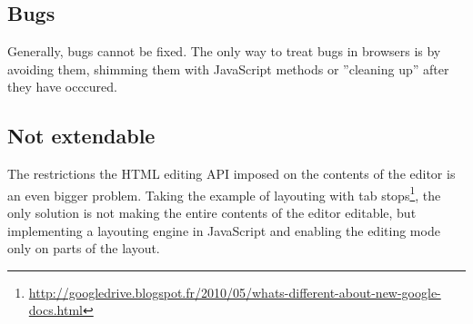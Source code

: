 \subsection{Bugs}

Generally, bugs cannot be fixed. The only way to treat bugs in browsers is by avoiding them, shimming them with JavaScript methods or ''cleaning up'' after they have occcured.

\subsection{Not extendable}
\label{subsec:treating_issues_last}

The restrictions the HTML editing API imposed on the contents of the editor is an even bigger problem. Taking the example of layouting with tab stops\footnote{\url{http://googledrive.blogspot.fr/2010/05/whats-different-about-new-google-docs.html}}, the only solution is not making the entire contents of the editor editable, but implementing a layouting engine in JavaScript and enabling the editing mode only on parts of the layout.



